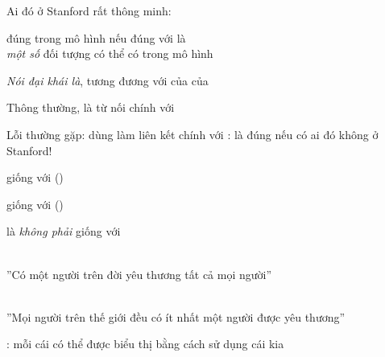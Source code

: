 \documentclass{article}
\begin{document}
\begin{huge}


Ai đó ở Stanford rất thông minh:\\

\quad đúng trong mô hình  nếu  đúng với  là \\
\emph{một số } đối tượng có thể có trong mô hình

\emph{Nói đại khái là}, tương đương với  của  của 


Thông thường, \mat{$\land$} là từ nối chính với \mat{$\exists$}

Lỗi thường gặp: dùng \mat{$\implies$} làm liên kết chính với \mat{$\exists$}:
là đúng nếu có ai đó không ở Stanford!




 giống với  ()

 giống với  ()

 là \emph{không phải} giống với 

\\
''Có một người trên đời yêu thương tất cả mọi người''

\\
''Mọi người trên thế giới đều có ít nhất một người được yêu thương''

: mỗi cái có thể được biểu thị bằng cách sử dụng cái kia


\end{huge}
\end{document}
